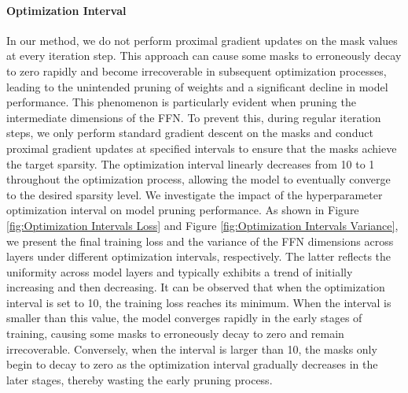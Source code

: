 \paragraph{Optimization Interval}




In our method, we do not perform proximal gradient updates on the mask values at every iteration step. This approach can cause some masks to erroneously decay to zero rapidly and become irrecoverable in subsequent optimization processes, leading to the unintended pruning of weights and a significant decline in model performance. This phenomenon is particularly evident when pruning the intermediate dimensions of the FFN. To prevent this, during regular iteration steps, we only perform standard gradient descent on the masks and conduct proximal gradient updates at specified intervals to ensure that the masks achieve the target sparsity. The optimization interval linearly decreases from 10 to 1 throughout the optimization process, allowing the model to eventually converge to the desired sparsity level. We investigate the impact of the hyperparameter optimization interval on model pruning performance. As shown in Figure \ref{fig:Optimization Intervals Loss} and Figure \ref{fig:Optimization Intervals Variance}, we present the final training loss and the variance of the FFN dimensions across layers under different optimization intervals, respectively. The latter reflects the uniformity across model layers and typically exhibits a trend of initially increasing and then decreasing. It can be observed that when the optimization interval is set to 10, the training loss reaches its minimum. When the interval is smaller than this value, the model converges rapidly in the early stages of training, causing some masks to erroneously decay to zero and remain irrecoverable. Conversely, when the interval is larger than 10, the masks only begin to decay to zero as the optimization interval gradually decreases in the later stages, thereby wasting the early pruning process.




